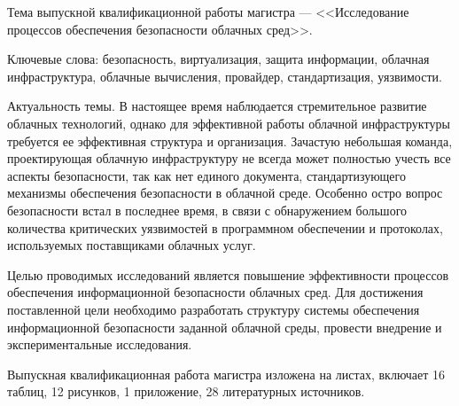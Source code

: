 
Тема выпускной квалификационной работы магистра --- <<Исследование процессов обеспечения безопасности облачных сред>>.

Ключевые слова: безопасность, виртуализация, защита информации, облачная инфраструктура, облачные вычисления, провайдер, стандартизация, уязвимости.

Актуальность темы.
В настоящее время наблюдается стремительное развитие облачных технологий, однако для эффективной работы облачной инфраструктуры требуется ее эффективная структура и организация.
Зачастую небольшая команда, проектирующая облачную инфраструктуру не всегда может полностью учесть все аспекты безопасности, так как нет единого документа, стандартизующего механизмы обеспечения безопасности в облачной среде.
Особенно остро вопрос безопасности встал в последнее время, в связи с обнаружением большого количества критических уязвимостей в программном обеспечении и протоколах, используемых поставщиками облачных услуг.

Целью проводимых исследований является повышение эффективности процессов обеспечения информационной безопасности облачных сред.
Для достижения поставленной цели необходимо разработать структуру системы обеспечения информационной безопасности  заданной облачной среды, провести внедрение и экспериментальные исследования.

Выпускная квалификационная работа магистра изложена на \pageref{LastPage} листах, включает 16 таблиц, 12 рисунков, 1 приложение, 28 литературных источников.

\clearpage
